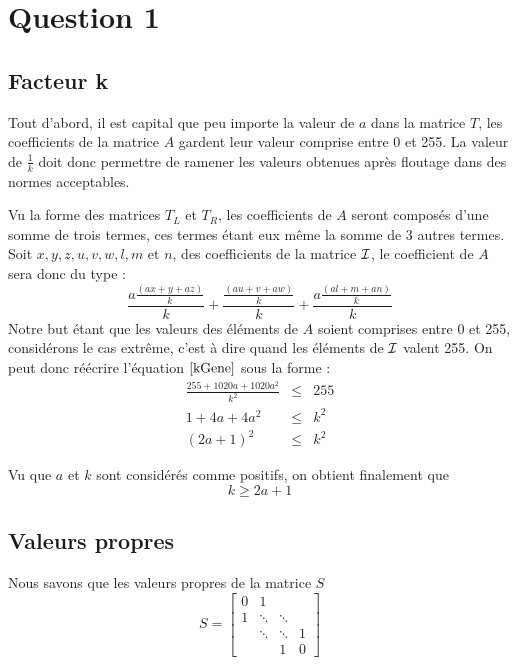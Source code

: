 \section{Question 1}

\subsection{Facteur k}
Tout d'abord, il  est capital que peu importe la valeur de $\textit{a}$ dans la matrice $\textit{T}$,
les coefficients de la matrice $\textit{A}$ gardent leur valeur comprise entre 0 et 255.
La valeur de $\frac{1}{k}$ doit donc permettre de ramener les valeurs obtenues après floutage dans des normes acceptables.

Vu la forme des matrices $T_L$ et $T_R$, les coefficients de $A$ seront composés d'une somme de trois termes,
ces termes étant eux même la somme de 3 autres termes.
Soit $x,y,z, u, v, w, l, m \text{ et } n$, des coefficients de la matrice $\mathcal{I}$,
le coefficient de $A$ sera donc du type :
\begin{equation} \label{kGene}
  \frac{a \frac{(ax+y+az)}{k}}{k} + \frac{\frac{(au+v+aw)}{k}}{k} + \frac{a \frac{(al+m+an)}{k}}{k}
\end{equation}
Notre but étant que les valeurs des éléments de $A$	soient comprises entre 0 et 255, considérons le cas extrême,
c'est à dire quand les éléments de $\mathcal{I}$ valent 255.
On peut donc réécrire l'équation $\ref{kGene}$ sous la forme :
\begin{eqnarray}
\frac{255+1020a+1020a^2}{k^2} &\leq & 255 \\
1+4a+4a^2 &\leq & k^2 \\
(2a+1)^2 &\leq & k^2
\end{eqnarray}

Vu que $a$ et $k$ sont considérés comme positifs, on obtient finalement que
\begin{equation}
k \geq 2a+1
\end{equation}

\subsection{Valeurs propres}
Nous savons que les valeurs propres de la matrice $S$
$$
S =
 \begin{bmatrix}
    0 & 1 		& 			& \\
    1 & \ddots 	& \ddots 	& \\
      & \ddots 	& \ddots 	& 1 \\
      & 		& 1			& 0
  \end{bmatrix}
$$

